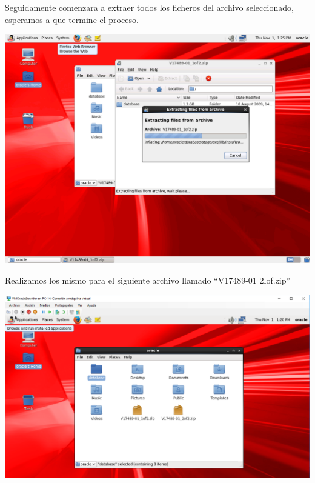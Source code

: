 Seguidamente comenzara a extraer todos los ficheros del archivo seleccionado, esperamos a que termine el proceso.
\begin{center}
	\includegraphics[width=15cm]{./Imagenes/61} 
\end{center} 

\vspace{\baselineskip}

Realizamos los mismo para el siguiente archivo llamado “V17489-01 2lof.zip”
\begin{center}
	\includegraphics[width=15cm]{./Imagenes/62} 
\end{center} 

\vspace{\baselineskip}

